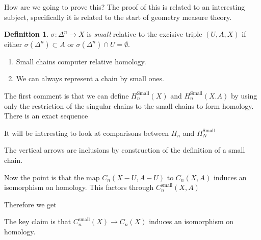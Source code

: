 \documentclass[10pt]{article}
\theoremstyle{definition}
\newtheorem{definition}[theorem]{Definition}
\begin{document}
	How are we going to prove this? The proof of this is related to an interesting subject, specifically it is related to the start of geometry measure theory.
	\begin{definition}
		$\sigma:\Delta^n\to X$ is \textit{small} relative to the excisive triple $(U,A,X)$ if either $\sigma(\Delta^n)\subset A$ or $\sigma(\Delta^n)\cap U=\emptyset$. 
	\end{definition}
	\begin{enumerate}
		\item Small chains computer relative homology.
		\item We can always represent a chain by small ones. 
	\end{enumerate}
	The first comment is that we can define $H_n^{\text{Small}}(X)$ and $H_n^{\text{Small}}(X.A)$ by using only the restriction of the singular chains to the small chains to form homology. There is an exact sequence \begin{center}
	\end{center}
	It will be interesting to look at comparisons between $H_n$ and $H_N^{\text{Small}}$
	\begin{center}
	\end{center}
	The vertical arrows are inclusions by construction of the definition of a small chain.
	
	Now the point is that the map $C_n(X-U,A-U)$ to $C_n(X,A)$ induces an isomorphism on homology. This factors through $C_n^{\text{small}}(X,A)$
	
	Therefore we get \begin{center}
	\end{center}
	The key claim is that $C_n^{\text{small}}(X)\to C_n(X)$ induces an isomorphism on homology.
	
\end{document}
